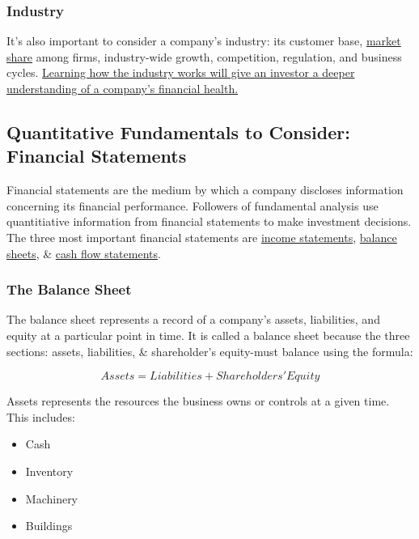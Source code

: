 \documentclass{article}
\begin{document}
	\subsubsection{Industry}

	It's also important to consider a company's industry: its customer base, \href{https://www.investopedia.com/terms/m/marketshare.asp}{market share} among firms, industry-wide growth, competition,
	regulation, and business cycles. \underline{Learning how the industry works will give an investor a deeper understanding of a company's financial health.} \newline

	\subsection{Quantitative Fundamentals to Consider: Financial Statements}

	Financial statements are the medium by which a company discloses information concerning its financial performance. Followers of fundamental analysis use quantitiative information from financial 
	statements to make investment decisions. The three most important financial statements are \href{https://www.investopedia.com/terms/i/incomestatement.asp}{income statements}, \href{https://www.investopedia.com/terms/b/balancesheet.asp}
	{balance sheets}, \& \href{https://www.investopedia.com/terms/c/cashflow.asp}{cash flow statements}. \newline

	\subsubsection{The Balance Sheet}

	The balance sheet represents a record of a company's assets, liabilities, and equity at a particular point in time. It is called a balance sheet because the three sections: assets, liabilities,
	\& shareholder's equity-must balance using the formula:

	\begin{equation}
		Assets = Liabilities + Shareholders' Equity
	\end{equation}

	Assets represents the resources the business owns or controls at a given time. This includes: \newline

	\begin{itemize}
		\item Cash
		\item Inventory
		\item Machinery
		\item Buildings
	\end{itemize}
\end{document}
